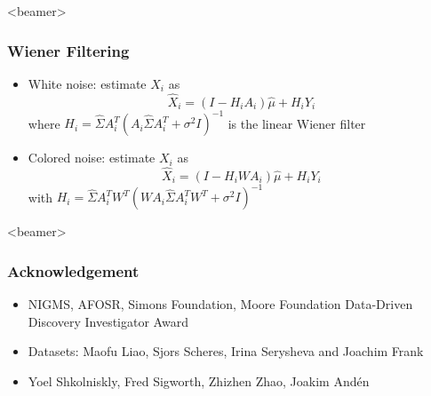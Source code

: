 \documentclass{beamer}
\begin{document}
\begin{frame}<beamer>
\frametitle{Wiener Filtering}

\begin{itemize}
\item White noise: estimate $X_i$ as
\begin{equation}
\hat X_i = (I-H_iA_{i})\hat\mu + H_iY_i 
\end{equation}
where $H_i = \hat \Sigma A_{i}^T ( A_{i} \hat \Sigma A_{i}^T + \sigma^2 
I)^{-1} $ is the linear Wiener filter  
\item Colored noise: estimate $X_i$ as
\begin{equation}
\hat X_i = (I-H_iWA_{i})\hat\mu + H_iY_i 
\end{equation}
with $H_i = \hat \Sigma A_{i}^T W^T (W A_{i} \hat \Sigma A_{i}^T W^T 
+ \sigma^2 I)^{-1}$
\end{itemize}
\end{frame}


\begin{frame}<beamer>
\frametitle{Acknowledgement}
\begin{itemize}
 \item  NIGMS, AFOSR, Simons
Foundation, Moore Foundation Data-Driven Discovery Investigator Award
\item  Datasets: Maofu Liao, Sjors Scheres, Irina Serysheva and Joachim Frank
\item Yoel Shkolniskly, Fred Sigworth, Zhizhen Zhao, Joakim And\'en
\end{itemize}
\end{frame}
\end{document}
